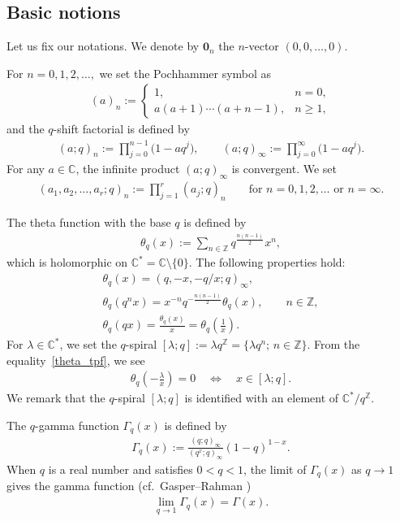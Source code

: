 \documentclass[pdftex]{sigma}
\numberwithin{equation}{section}
\begin{document}
\subsection{Basic notions}
Let us fix our notations. We denote by $\bm{0}_n$ the $n$-vector $(0,0,\ldots,0)$.

For $n=0,1,2,\ldots,$ we set the Pochhammer symbol as
\begin{gather*}
(a)_n:=
\begin{cases}
1,& n=0,\\
a(a+1)\cdots(a+n-1), &n\geq1,
\end{cases}
\end{gather*}
and the $q$-shift factorial is defined by
\begin{gather*}
(a;q)_n:=\prod_{j=0}^{n-1}\big(1-aq^j\big),\qquad (a;q)_\infty:=\prod_{j=0}^\infty \big(1-aq^j\big).
\end{gather*}
For any $a\in\mathbb{C}$, the infinite product $(a;q)_\infty$ is convergent. We set
\begin{gather*} (a_1,a_2,\ldots,a_r;q)_{n}:=\prod\limits_{j=1}^r (a_j;q)_n \qquad \text{for $n=0,1,2,\ldots$ or $n=\infty$}.
\end{gather*}

The theta function with the base $q$ is defined by
\begin{gather*}
\theta_q(x):=\sum_{n\in\mathbb{Z}}q^{\frac{n(n-1)}{2}}x^n,
\end{gather*}
which is holomorphic on $\mathbb{C}^*=\mathbb{C}\setminus\{0\}$. The following properties hold:
\begin{gather}
\theta_q(x) =(q,-x,-q/x;q)_\infty,\label{theta_tpf}\\
\theta_q(q^nx) =x^{-n}q^{-\frac{n(n-1)}{2}}\theta_q(x),\qquad n\in\mathbb{Z},\label{theta_q-diff}\\
\theta_q(qx) =\frac{\theta_q(x)}{x}=\theta_q\left(\frac{1}{x}\right)\label{theta_inverse}.
\end{gather}
For $\lambda\in\mathbb{C}^*$, we set the $q$-spiral $[\lambda;q]:=\lambda q^\mathbb{Z}=\{\lambda q^n ;\,n\in\mathbb{Z}\}$. From the equality~\eqref{theta_tpf}, we see
\begin{gather*}
\theta_q\left(-\frac{\lambda}{x}\right)=0\quad \Leftrightarrow \quad x\in[\lambda;q].
\end{gather*}
We remark that the $q$-spiral $[\lambda;q]$ is identified with an element of $\mathbb{C}^*/q^\mathbb{Z}$.

The $q$-gamma function $\Gamma_q(x)$ is defined by
\begin{gather*}
\Gamma_q(x):=\frac{(q;q)_\infty}{(q^x;q)_\infty}(1-q)^{1-x}.
\end{gather*}
When $q$ is a real number and satisfies $0<q<1$, the limit of $\Gamma_q(x)$ as $q\to1$ gives the gamma function (cf.\ Gasper--Rahman {\cite[Section~1.10]{Gasper&Rahman2004}})
\begin{gather}\label{qgamma_reduction}
\lim_{q\to1}\Gamma_q(x)=\Gamma(x).
\end{gather}
\end{document}
